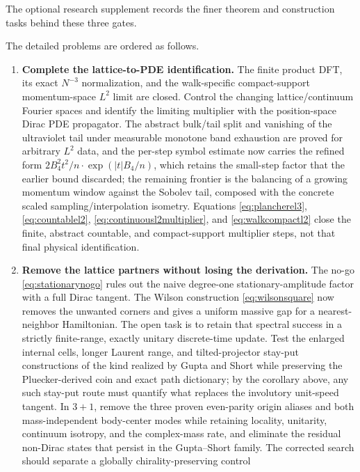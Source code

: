 \documentclass[11pt]{article}
\newif\ifextendedfrontiers
\begin{document}
The optional research supplement records the finer theorem and construction
tasks behind these three gates.

\ifextendedfrontiers
The detailed problems are ordered as follows.
\begin{enumerate}[leftmargin=2em]
  \item \textbf{Complete the lattice-to-PDE identification.}
  The finite product DFT, its exact $N^{-3}$ normalization, and the
  walk-specific compact-support momentum-space $L^2$ limit are closed.  Control
  the changing lattice/continuum Fourier spaces and identify the limiting
  multiplier with the position-space Dirac PDE propagator.  The abstract
  bulk/tail split and vanishing of the ultraviolet tail under measurable
  monotone band exhaustion are proved for arbitrary $L^2$ data, and the
  per-step symbol estimate now carries the refined form
  $2B_4^2t^2/n\cdot\exp(|t|B_4/n)$, which retains the small-step factor
  that the earlier bound discarded; the remaining frontier is the
  balancing of a growing momentum window against the Sobolev tail,
  composed with the concrete scaled sampling/interpolation isometry.
  Equations \eqref{eq:plancherel3}, \eqref{eq:countablel2},
  \eqref{eq:continuousl2multiplier}, and \eqref{eq:walkcompactl2} close the
  finite, abstract countable, and compact-support multiplier steps, not that
  final physical identification.
  \item \textbf{Remove the lattice partners without losing the derivation.}
  The no-go \eqref{eq:stationarynogo} rules out the naive degree-one
  stationary-amplitude factor with a full Dirac tangent.  The Wilson
  construction \eqref{eq:wilsonsquare} now removes the unwanted corners and
  gives a uniform massive gap for a nearest-neighbor Hamiltonian.  The open
  task is to retain that spectral success in a strictly finite-range,
  exactly unitary discrete-time update.  Test the enlarged
  internal cells, longer Laurent range, and tilted-projector stay-put
  constructions of the kind realized by Gupta and Short
  \cite{GuptaShortDoubling} while preserving the
  Pluecker-derived coin and exact path dictionary; by the corollary above,
  any such stay-put route must quantify what replaces the involutory
  unit-speed tangent.  In $3+1$, remove the three
  proven even-parity origin
   aliases and both mass-independent body-center modes while retaining locality,
   unitarity, continuum isotropy, and the complex-mass rate, and eliminate
   the residual non-Dirac states that persist in the Gupta--Short family.
   The corrected search should separate a globally chirality-preserving control

\end{enumerate}
\end{document}
